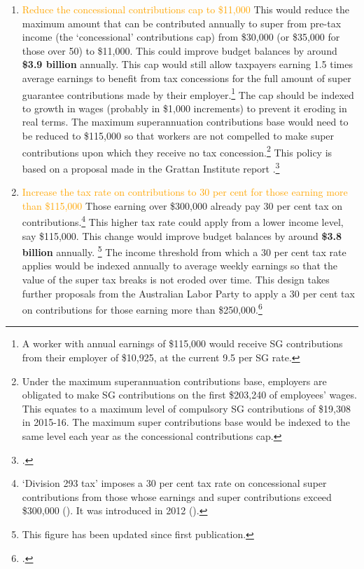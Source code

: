 \documentclass{grattanAlpha}
\begin{document}
\DEVIATION{}
\begin{enumerate}
\item 
\textcolor{Orange}{Reduce the concessional contributions cap to \$11,000} \quad
This would reduce the maximum amount that can be contributed annually to super from pre-tax income (the ‘concessional’ contributions cap) from \$30,000 (or \$35,000 for those over 50) to \$11,000. This could improve budget balances by around \textbf{\$3.9 billion} annually. This cap would still allow taxpayers earning 1.5 times average earnings to benefit from tax concessions for the full amount of super guarantee contributions made by their employer.\footnote{A worker with annual earnings of \$115,000 would receive SG contributions from their employer of \$10,925, at the current 9.5 per SG rate.}  The cap should be indexed to growth in wages (probably in \$1,000 increments) to prevent it eroding in real terms. The maximum superannuation contributions base would need to be reduced to \$115,000 so that workers are not compelled to make super contributions upon which they receive no tax concession.\footnote{Under the maximum superannuation contributions base, employers are obligated to make SG contributions on the first \$203,240 of employees’ wages. This equates to a maximum level of compulsory SG contributions of \$19,308 in 2015-16. The maximum super contributions base would be indexed to the same level each year as the concessional contributions cap.}  This policy is based on a proposal made in the Grattan Institute report .\footcite[][32]{DaleyMcGannonSavageEtAl2013BalancingBudgets} 

\item 
\textcolor{Orange}{Increase the tax rate on contributions to 30 per cent for those earning more than \$115,000} \quad
Those earning over \$300,000 already pay 30 per cent tax on contributions.\footnote{‘Division 293 tax’ imposes a 30 per cent tax rate on concessional super contributions from those whose earnings and super contributions exceed \$300,000 (\textcite{ATO2015HowisDiv293calculated}). It was introduced in 2012 (\textcite{Shorten2012}).}  This higher tax rate could apply from a lower income level, say \$115,000. This change would improve budget balances by around \textbf{\$3.8 billion} annually.%
\renewcommand*{\thefootnote}{\fnsymbol{footnote}}%
\footnote[1]{This figure has been updated since first publication.} %
\renewcommand*{\thefootnote}{\arabic{footnote}}%
 The income threshold from which a 30 per cent tax rate applies would be indexed annually to average weekly earnings so that the value of the super tax breaks is not eroded over time. This design takes further proposals from the Australian Labor Party to apply a 30 per cent tax on contributions for those earning more than \$250,000.\footcite{ALP2015FairerSuper}  


\end{enumerate}
\end{document}
